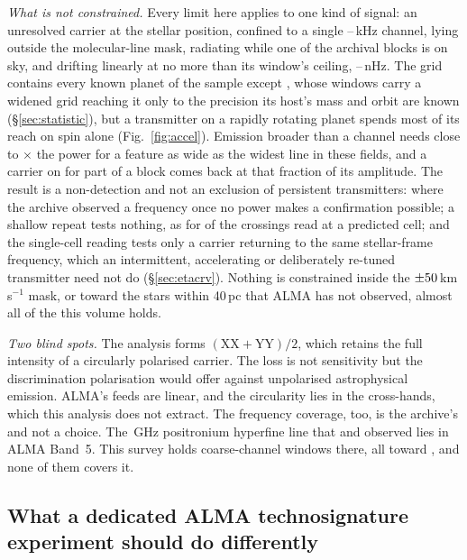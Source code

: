 \noindent\emph{What is not constrained.} Every limit here applies to one kind
of signal: an unresolved carrier at the stellar position, confined to a single
\ChanLoA--\ChanHiA\,kHz channel, lying outside the molecular-line mask,
radiating while one of the archival blocks is on sky, and drifting linearly at
no more than its window's ceiling, \DriftCeilLo--\DriftCeilHi\,nHz. The grid
contains every known planet of the sample except \AccelWorstName, whose
windows carry a widened grid reaching it only to the precision its host's mass
and orbit are known (\S\ref{sec:statistic}), but a transmitter on a
rapidly rotating planet spends most of its reach on spin alone
(Fig.~\ref{fig:accel}). Emission broader than a channel needs close to
\ScNBroadRatio$\times$ the power for a feature as wide as the widest line in
these fields, and a carrier on for part of a block comes back at that fraction
of its amplitude. The result is a non-detection and not an exclusion of
persistent transmitters: where the archive observed a frequency once no power
makes a confirmation possible; a shallow repeat tests nothing, as for
\HjNPowerLo{} of the \RcNExcl{} crossings read at a predicted cell; and the
single-cell reading tests only a carrier returning to the same stellar-frame
frequency, which an intermittent, accelerating or deliberately re-tuned
transmitter need not do (\S\ref{sec:etacrv}). Nothing is constrained inside
the $\pm50$\,km\,s$^{-1}$ mask, or toward the stars within 40\,pc
that ALMA has not observed, almost all of the \NGaiaCensus{} this volume holds.

\noindent\emph{Two blind spots.} The analysis forms
$(\mathrm{XX}+\mathrm{YY})/2$, which retains the full intensity of a circularly
polarised carrier. The loss is not sensitivity but the discrimination
polarisation would offer against unpolarised astrophysical emission.
ALMA's feeds are linear, and the circularity lies in the cross-hands, which this
analysis does not extract. The frequency coverage, too, is the archive's and not a
choice. The \SbPriorFreqGHz\,GHz positronium hyperfine line that
\citet{Steffes1994} and \citet{Mauersberger1996} observed lies in ALMA Band~5.
This survey holds \LnBFiveWin{} coarse-channel windows there, all toward
\LnBFiveStars, and none of them covers it.

\subsection{What a dedicated ALMA technosignature experiment should do
differently}
\label{sec:future}

